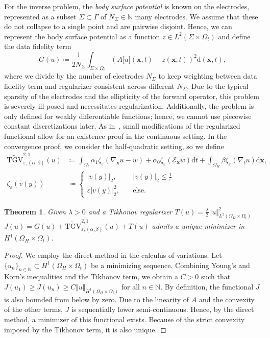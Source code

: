 \documentclass{article}
\newcommand{\dx}{\mathrm{d}}
\newcommand{\N}{\mathbb{N}}
\newcommand{\TGV}{\mathrm{TGV}}
\newcommand{\OmegaTime}{\Omega_t}
\newtheorem{theorem}{Theorem}[section]
\begin{document}
	For the inverse problem, the \emph{body surface potential} is known on the electrodes, represented as a subset $\Sigma \subset \Gamma$ of $N_\Sigma \in \N$ many electrodes.
	We assume that these do not collapse to a single point and are pairwise disjoint.
	Hence, we can represent the body surface potential as a function $z \in L^2(\Sigma \times \OmegaTime)$ and define the data fidelity term
	\begin{equation*}
		{G}(u)\coloneqq \frac{1}{2 N_\Sigma} \int_{\Sigma \times \OmegaTime} \left( A\lbrack u\rbrack(\mathbf{x}, t) - z(\mathbf{x}, t)\right)^2 \dx (\mathbf{x}, t),
	\end{equation*}
	where we divide by the number of electrodes $N_\Sigma$ to keep weighting between data fidelity term and regularizer consistent across different $N_\Sigma$.
	Due to the typical sparsity of the electrodes and the ellipticity of the forward operator, this problem is severely ill-posed and necessitates regularization.
	Additionally, the problem is only defined for weakly differentiable functions; hence, we cannot use piecewise constant discretizations later.
	As in~\cite{Ha25}, small modifications of the regularized functional allow for an existence proof in the continuous setting.
	In the convergence proof, we consider the half-quadratic setting, so we define
	\begin{align*}
		\widetilde{\TGV}^{2, 1}_{\varepsilon, (\alpha, \beta)}(u) &\coloneqq \int_{\OmegaTime} \alpha_1\zeta_\varepsilon(\nabla_\mathbf{x}u - w)  + \alpha_0\zeta_\varepsilon(\mathcal{E}_\mathbf{x}w)\dx t+ \int_{\Omega_H} \beta \zeta_\varepsilon(\nabla_tu) \dx \mathbf{x},\\
		\zeta_\varepsilon(v(y)) &\coloneqq \begin{cases}  \vert v(y)\vert_2, \quad& \vert v(y)\vert_2 \leq \frac{1}{\varepsilon}\\
			\varepsilon \vert v(y)\vert_2^2, \quad&\text{else.}
		\end{cases} 
	\end{align*}
	\begin{theorem}
		Given $\lambda >0$ and a Tikhonov regularizer $T(u) = \frac{\lambda}{2}\Vert u \Vert_{L^2(\Omega_H\times \OmegaTime)}^2$ ${J}(u) = {G}(u) +  \widetilde{\TGV}^{2, 1}_{\varepsilon, (\alpha, \beta)}(u) + T(u)$ admits a unique minimizer in $H^1(\Omega_H \times\OmegaTime)$.
	\end{theorem}
	\begin{proof}
		We employ the direct method in the calculus of variations. Let $\lbrace u_n\rbrace_{n\in \N} \subset H^1(\Omega_H \times\OmegaTime) $ be a minimizing sequence.
		Combining Young's and Korn's inequalities and the Tikhonov term, we obtain a $C>0$ such that ${J}(u_1) \geq {J}(u_n) \geq C \Vert u \Vert_{H^1(\Omega_H \times\OmegaTime)}$ for all $n\in \N$.
		By definition, the functional $J$ is also bounded from below by zero.
		Due to the linearity of $A$ and the convexity of the other terms, $J$ is sequentially lower semi-continuous. 
		Hence, by the direct method, a minimizer of this functional exists.
		Because of the strict convexity imposed by the Tikhonov term, it is also unique.
	\end{proof}
\end{document}
